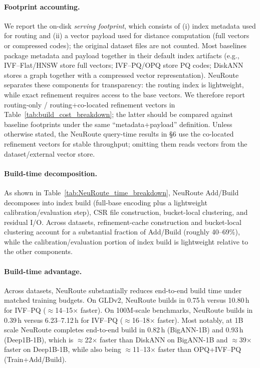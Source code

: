 \documentclass[sigconf, nonacm]{acmart}
\begin{document}
\paragraph{Footprint accounting.}
We report the on-disk \emph{serving footprint}, which consists of (i) index metadata used for routing and (ii) a vector payload used for distance computation (full vectors or compressed codes); the original dataset files are not counted.
Most baselines package metadata and payload together in their default index artifacts (e.g., IVF--Flat/HNSW store full vectors; IVF--PQ/OPQ store PQ codes; DiskANN stores a graph together with a compressed vector representation).
NeuRoute separates these components for transparency: the routing index is lightweight, while exact refinement requires access to the base vectors. We therefore report routing-only / routing+co-located refinement vectors in Table~\ref{tab:build_cost_breakdown}; the latter should be compared against baseline footprints under the same “metadata+payload” definition.
Unless otherwise stated, the NeuRoute query-time results in \S6 use the co-located refinement vectors for stable throughput; omitting them reads vectors from the dataset/external vector store.

\paragraph{Build-time decomposition.}
As shown in Table~\ref{tab:NeuRoute_time_breakdown}, NeuRoute Add/Build decomposes into index build (full-base encoding plus a lightweight calibration/evaluation step), CSR file construction, bucket-local clustering, and residual I/O.
Across datasets, refinement-cache construction and bucket-local clustering account for a substantial fraction of Add/Build (roughly 40--69\%), while the calibration/evaluation portion of index build is lightweight relative to the other components.

\paragraph{Build-time advantage.}
Across datasets, NeuRoute substantially reduces end-to-end build time under matched training budgets.
On GLDv2, NeuRoute builds in 0.75\,h versus 10.80\,h for IVF--PQ ($\approx$14--15$\times$ faster).
On 100M-scale benchmarks, NeuRoute builds in 0.39\,h versus 6.23--7.12\,h for IVF--PQ ($\approx$16--18$\times$ faster).
Most notably, at 1B scale NeuRoute completes end-to-end build in 0.82\,h (BigANN-1B) and 0.93\,h (Deep1B-1B), which is $\approx$22$\times$ faster than DiskANN on BigANN-1B and $\approx$39$\times$ faster on Deep1B-1B, while also being $\approx$11--13$\times$ faster than OPQ+IVF--PQ (Train+Add/Build).
\end{document}
